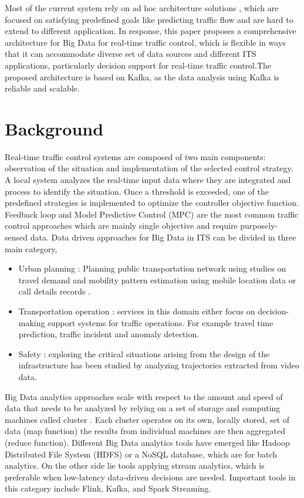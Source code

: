 \documentclass[sigconf]{acmart}
\begin{document}
Most of the current system rely on ad hoc architecture solutions \cite{mapreduce} \cite{infomin}, which are focused on satisfying predefined goals like predicting traffic flow and are hard to extend to different application. In response, this paper proposes a comprehensive architecture for Big Data for real-time traffic control, which is flexible in ways that it can accommodate diverse set of data sources and different ITS applications, particularly decision support for real-time traffic control.The proposed architecture is based on Kafka, as the data analysis using Kafka is reliable and scalable.

\section{Background}
Real-time traffic control systems are composed of two main components: observation of the situation and implementation of the selected
control strategy. A local system analyzes the real-time input data
where they are integrated and process to identify the situation. Once a threshold is exceeded, one of the predefined strategies is implemented to optimize the controller objective function. Feedback loop and Model Predictive Control (MPC)\cite{mpc} are the most common traffic control approaches which are mainly single objective and require purposely-sensed data.
Data driven approaches for Big Data in ITS can be divided in three main category,

\begin{itemize}
    \item Urban planning : Planning public transportation network using studies on travel demand and mobility pattern estimation using mobile location data\cite{mpc} or call details records \cite{phcl}.
    \item Transportation operation : services in this domain either focus on decision-making support systems for traffic operations. For example travel time prediction\cite{timepred}, traffic incident and anomaly detection\cite{trafano}.
    \item Safety : exploring the critical situations arising from the design of the infrastructure has been studied by analyzing trajectories extracted from video data\cite{largscal}.
\end{itemize}

Big Data analytics approaches scale with respect to the amount and speed of data that needs to be analyzed by relying on a set of storage and computing machines called cluster \cite{clstr}. Each cluster operates on its own, locally stored, set of data (map function) the results from individual machines are then aggregated (reduce function). Different Big Data analytics tools have emerged like Hadoop Distributed File System (HDFS) or a NoSQL database, which are for batch analytics. On the other side lie tools applying stream analytics, which is preferable when low-latency \cite{lowlat} data-driven decisions are needed. Important tools in this category include Flink, Kafka, and Spark Streaming. 
\end{document}
